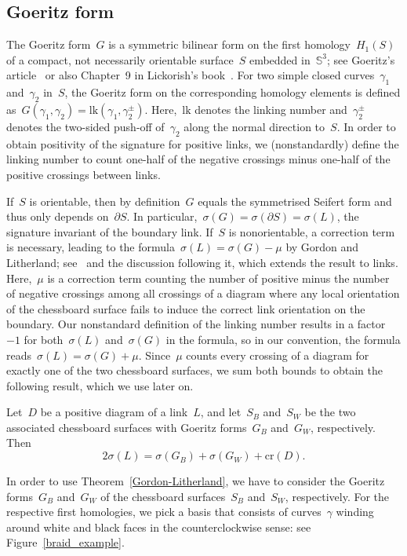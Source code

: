 \documentclass[AHL,Unicode,longabstracts,published]{cedram}
\newcommand{\rcr}{\mathrm{cr}}
\newcommand{\bbS}{\mathbb{S}}
\newcommand{\rlk}{\mathrm{lk}}
\begin{document}
\subsection{Goeritz form}

The Goeritz form~$G$ is a symmetric bilinear form on the first homology~$H_1(S)$ of a compact, not necessarily orientable surface~$S$ embedded in~$\bbS^3$; see Goeritz's article~\cite{Goeritz} or also Chapter~9 in Lickorish's book~\cite{Lickorish}. For two simple closed curves~$\gamma_1$ and~$\gamma_2$ in~$S$, the Goeritz form on the corresponding homology elements is defined as~$G(\gamma_1, \gamma_2) = \rlk (\gamma_1,\gamma_2^\pm)$. Here,~$\rlk $ denotes the linking number and~$\gamma_2^\pm$ denotes the two-sided push-off of~$\gamma_2$ along the normal direction to~$S$. In order to obtain positivity of the signature for positive links, we (nonstandardly) define the linking number to count one-half of the negative crossings minus one-half of the positive crossings between links.


If~$S$ is orientable, then by definition~$G$ equals the symmetrised Seifert form and thus only depends on~$\partial S$. In particular,~$\sigma(G) = \sigma(\partial S) = \sigma(L)$, the signature invariant of the boundary link. If~$S$ is nonorientable, a correction term is necessary, leading to the formula~$\sigma(L) = \sigma(G) - \mu$ by Gordon and Litherland; see~\cite[Theorem~6]{GL} and the discussion following it, which extends the result to links. Here,~$\mu$ is a correction term counting the number of positive minus the number of negative crossings among all crossings of a diagram where any local orientation of the chessboard surface fails to induce the correct link orientation on the boundary. Our nonstandard definition of the linking number results in a factor~$-1$ for both~$\sigma(L)$ and~$\sigma(G)$ in the formula, so in our convention, the formula reads~$\sigma(L) = \sigma(G) + \mu$. Since~$\mu$ counts every crossing of a diagram for exactly one of the two chessboard surfaces, we sum both bounds to obtain the following result, which we use later on.

\begin{theo}\label{Gordon-Litherland}
Let~$D$ be a positive diagram of a link~$L$, and let~$S_B$ and~$S_W$ be the two associated chessboard surfaces with Goeritz forms~$G_B$ and~$G_W$, respectively. Then
\[
2\sigma(L) = \sigma(G_B) + \sigma(G_W) + \rcr (D).
\]
\end{theo}

In order to use Theorem~\ref{Gordon-Litherland}, we have to consider the Goeritz forms~$G_B$ and~$G_W$ of the chessboard surfaces~$S_B$ and~$S_W$, respectively. For the respective first homologies, we pick a basis that consists of curves~$\gamma$ winding around white and black faces in the counterclockwise sense: see Figure~\ref{braid_example}.
\end{document}
